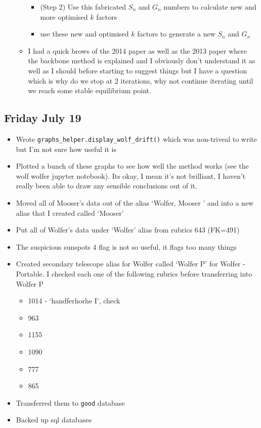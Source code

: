 \documentclass[12pt]{article}
\begin{document}
\begin{itemize}
\begin{itemize}
\begin{itemize}
            \item (Step 2) Use this fabricated $S_n$ and $G_n$ numbers to calculate new and more optimised $k$ factors 
            \item use these new and optimised $k$ factors to generate a new $S_n$ and $G_n$
        \end{itemize}
        \item I had a quick brows of the 2014 paper as well as the 2013 paper where the backbone method is explained and I obviously don't understand it as well as I should before starting to suggest things but I have a question which is why do we stop at 2 iterations, why not continue iterating until we reach some stable equilibrium point.
    \end{itemize}
\end{itemize}

\subsection{Friday July 19}
\begin{itemize}
    \item Wrote \texttt{graphs\_helper.display\_wolf\_drift()} which was non-triveal to write but I'm not sure how useful it is 
    \item Plotted a bunch of these graphs to see how well the method works (see the wolf wolfer jupyter notebook). Its okay, I mean it's not brilliant, I haven't really been able to draw any sensible conclusions out of it.
    \item Moved all of Mooser's data out of the alias `Wolfer, Mooser ' and into a new alias that I created called `Mooser'
    \item Put all of Wolfer's data under `Wolfer' alias from rubrics 643 (FK=491)
    \item The suspicious sunspots 4 flag is not so useful, it flags too many things
    \item Created secondary telescope alias for Wolfer called `Wolfer P' for Wolfer - Portable. I checked each one of the following rubrics before transferring into Wolfer P
    \begin{itemize}
        \item 1014 - `handferhorhe I', check
        \item 963
        \item 1155
        \item 1090
        \item 777
        \item 865
    \end{itemize}
    \item Transferred them to \texttt{good} database
    \item Backed up sql databases
\end{itemize}
\end{document}
